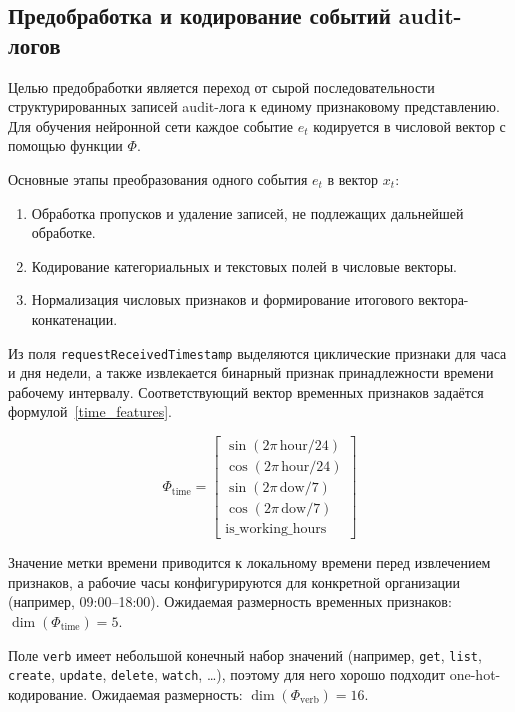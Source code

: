 \subsection{Предобработка и кодирование событий audit-логов}

Целью предобработки является переход от сырой последовательности структурированных записей audit-лога к единому признаковому представлению. Для обучения нейронной сети каждое событие $e_t$ кодируется в числовой вектор с помощью функции $\Phi$.

Основные этапы преобразования одного события \(e_t\) в вектор \(x_t\):

\begin{enumerate}
    \item Обработка пропусков и удаление записей, не подлежащих дальнейшей обработке.
    \item Кодирование категориальных и текстовых полей в числовые векторы.
    \item Нормализация числовых признаков и формирование итогового вектора-конкатенации.
\end{enumerate}

Из поля \texttt{requestReceivedTimestamp} выделяются циклические признаки для часа и дня недели, а также извлекается бинарный признак принадлежности времени рабочему интервалу. Соответствующий вектор временных признаков задаётся формулой~\eqref{time_features}.

\begin{equation}\label{time_features}
    \Phi_{\text{time}}=
    \begin{bmatrix}
    \sin(2\pi\,\mathrm{hour}/24)\\[2mm]
    \cos(2\pi\,\mathrm{hour}/24)\\[2mm]
    \sin(2\pi\,\mathrm{dow}/7)\\[2mm]
    \cos(2\pi\,\mathrm{dow}/7)\\[1mm]
    \mathrm{is\_working\_hours}
    \end{bmatrix}
\end{equation}

Значение метки времени приводится к локальному времени перед извлечением признаков, а рабочие часы конфигурируются для конкретной организации (например, 09:00–18:00). Ожидаемая размерность временных признаков: $\dim(\Phi_{\text{time}}) = 5$.

Поле \texttt{verb} имеет небольшой конечный набор значений (например, \texttt{get}, \texttt{list}, \texttt{create}, \texttt{update}, \texttt{delete}, \texttt{watch}, \dots), поэтому для него хорошо подходит one-hot-кодирование. Ожидаемая размерность: $\dim(\Phi_{\text{verb}}) = 16$.

